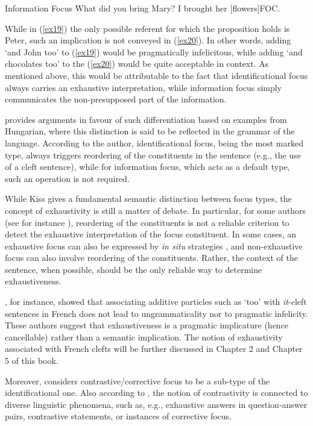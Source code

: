 \ea \label{ex20}  {Information Focus}
\ea What did you bring Mary?
\ex I brought her [flowers]\tiny FOC.
\z \z

While in (\ref{ex19}) the only possible referent for which the proposition holds is Peter, such an implication is not conveyed in (\ref{ex20}). In other words, adding ‘and John too' to (\ref{ex19}) would be pragmatically infelicitous, while adding ‘and chocolates too' to the (\ref{ex20}) would be quite acceptable in context. As mentioned above, this would be attributable to the fact that identificational focus always carries an exhaustive interpretation, while information focus simply communicates the non-presupposed part of the information.

\textcite{kiss1998identificational} provides arguments in favour of such differentiation based on examples from Hungarian, where this distinction is said to be reflected in the grammar of the language. According to the author, identificational focus, being the most marked type, always triggers reordering of the constituents in the sentence (e.g., the use of a cleft sentence), while for information focus, which acts as a default type, such an operation is not required.

While Kiss gives a fundamental semantic distinction between focus types, the concept of exhaustivity is still a matter of debate. In particular, for some authors (see for instance \cite{horn1981exhaustiveness, destruel2018interpretation}), reordering of the constituents is not a reliable criterion to detect the exhaustive interpretation of the focus constituent. In some cases, an exhaustive focus can also be expressed by \textit{in situ} strategies \parencite{gabriel2010focus, fery2001focus, uth2014spanish}, and non-exhaustive focus can also involve reordering of the constituents. Rather, the context of the sentence, when possible, should be the only reliable way to determine exhaustiveness. 

\textcite{destruel2012french}, for instance, showed that associating additive particles such as `too' with \textit{it}-cleft sentences in French does not lead to ungrammaticality nor to pragmatic infelicity. These authors suggest that exhaustiveness is a pragmatic implicature (hence cancellable) rather than a semantic implication. The notion of exhaustivity associated with French clefts will be further discussed in Chapter 2 and Chapter 5 of this book.

Moreover, \textcite{kiss1998identificational} considers contrastive/corrective focus to be a sub-type of the identificational one.
Also according to \textcite{tomioka2008information}, the notion of contrastivity is connected to diverse linguistic phenomena, such as, e.g., exhaustive answers in question-answer pairs, contrastive statements, or instances of corrective focus. 

